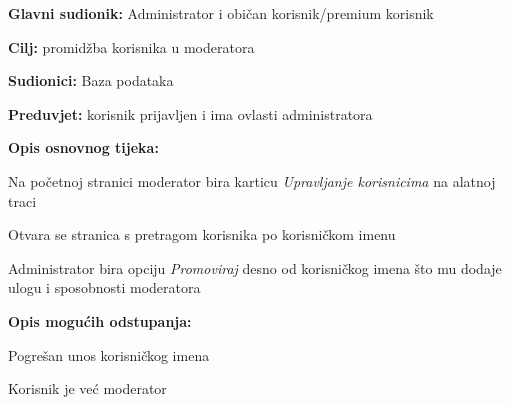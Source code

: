 					\noindent {}
					\begin{packed_item}
						
						\item \textbf{Glavni sudionik: }Administrator i običan korisnik/premium korisnik
						\item  \textbf{Cilj:} promidžba korisnika u moderatora
						\item  \textbf{Sudionici:}
						Baza podataka
						\item  \textbf{Preduvjet:} korisnik prijavljen i ima ovlasti administratora
						\item  \textbf{Opis osnovnog tijeka:}
						
						\item[] \begin{packed_enum}
							
							\item	Na početnoj stranici moderator bira karticu \textit{Upravljanje korisnicima} na alatnoj traci
							\item	Otvara se stranica s pretragom korisnika po korisničkom imenu
							\item	Administrator bira opciju \textit{Promoviraj} desno od korisničkog imena što mu dodaje ulogu i sposobnosti moderatora
							
						\end{packed_enum}
						
						\item  \textbf{Opis mogućih odstupanja:}
						
						\item[] \begin{packed_item}
							
							\item[2.a] Pogrešan unos korisničkog imena
							\item[3.a] Korisnik je već moderator
							
						\end{packed_item}
					\end{packed_item}
					
